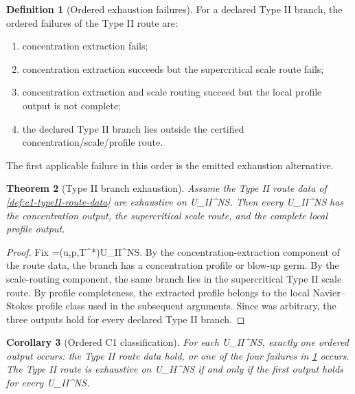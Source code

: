 \documentclass[11pt]{amsart}
\def\({}%
\def\){}%
\def\mathrm#1{#1}%
\theoremstyle{plain}
\newtheorem{theorem}{Theorem}[section]
\newtheorem{corollary}[theorem]{Corollary}
\theoremstyle{definition}
\newtheorem{definition}[theorem]{Definition}
\theoremstyle{remark}
\begin{document}
\begin{definition}[Ordered exhaustion failures]
\label{def:c1-exhaustion-failures}
For a declared Type II branch, the ordered failures of the Type II route are:
\begin{enumerate}[label=\textup{(\roman*)}]
\item concentration extraction fails;
\item concentration extraction succeeds but the supercritical scale route fails;
\item concentration extraction and scale routing succeed but the local profile
output is not complete;
\item the declared Type II branch lies outside the certified
concentration/scale/profile route.
\end{enumerate}
The first applicable failure in this order is the emitted exhaustion
alternative.
\end{definition}

\begin{theorem}[Type II branch exhaustion]
\label{thm:c1-typeII-branch-exhaustion}
Assume the Type II route data of \cref{def:c1-typeII-route-data} are exhaustive
on \(\mathcal U_{\mathrm{II}}^{NS}\).  Then every
\(\omega\in\mathcal U_{\mathrm{II}}^{NS}\) has the concentration output, the
supercritical scale route, and the complete local profile output.
\end{theorem}

\begin{proof}
Fix \(\omega=(u,p,T^*)\in\mathcal U_{\mathrm{II}}^{NS}\).  By the
concentration-extraction component of the route data, the branch has a
concentration profile or blow-up germ.  By the scale-routing component, the
same branch lies in the supercritical Type II scale route.  By profile
completeness, the extracted profile belongs to the local Navier--Stokes profile
class used in the subsequent arguments.  Since \(\omega\) was arbitrary, the
three outputs hold for every declared Type II branch.
\end{proof}

\begin{corollary}[Ordered C1 classification]
\label{cor:c1-ordered-exhaustion}
For each \(\omega\in\mathcal U_{\mathrm{II}}^{NS}\), exactly one ordered output
occurs: the Type II route data hold, or one of the four failures in
\cref{def:c1-exhaustion-failures} occurs.  The Type II route is exhaustive on
\(\mathcal U_{\mathrm{II}}^{NS}\) if and only if the first output holds for
every \(\omega\in\mathcal U_{\mathrm{II}}^{NS}\).
\end{corollary}
\end{document}

